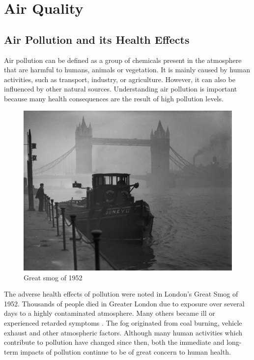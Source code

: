 \section{Air Quality}
\subsection{Air Pollution and its Health Effects}
Air pollution can be defined as a group of chemicals present in the atmosphere that are harmful to humans, animals or vegetation. It is mainly caused by human activities, such as transport, industry, or agriculture. However, it can also be influenced by other natural sources. Understanding air pollution is important because many health consequences are the result of high pollution levels. 
\begin{figure}[h]
  \centering
  \includegraphics[scale=.8]{images/great_smog.jpg}
  \caption[Great smog of 1952]{Great smog of 1952\footnotemark}
  \label{fig:interaction_design}
\end{figure}


The adverse health effects of pollution were noted in London's Great Smog of 1952. Thousands of people died in Greater London due to exposure over several days to a highly contaminated atmosphere. Many others became ill or experienced retarded symptoms \cite{Bell2008}. The fog originated from coal burning, vehicle exhaust and other atmospheric factors. Although many human activities which contribute to pollution have changed since then, both the immediate and long-term impacts of pollution continue to be of great concern to human health.


